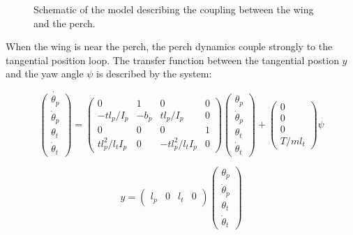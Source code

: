 \documentclass[11pt]{amsart}
\begin{document}
\begin{figure}[h]
  \caption{Schematic of the model describing the coupling between the
    wing and the perch.}
\end{figure}
When the wing is near the perch, the perch dynamics couple strongly to
the tangential position loop.  The transfer function between the
tangential postion $y$ and the yaw angle $\psi$ is described by the
system:

\begin{equation}
\dot{\left(
\begin{array}{c}
\theta_p \\
\dot{\theta}_p \\
\theta_t \\
\dot{\theta}_t
\end{array}
\right)}
=
\left(
\begin{array}{cccc}
0 & 1 & 0 & 0 \\
-t l_p/I_p & -b_p & t l_p/I_p & 0 \\
0 & 0 & 0 & 1 \\
t l_p^2/l_t I_p & 0 & -t l_p^2/l_t I_p & 0
\end{array}
\right)
\left(
\begin{array}{c}
\theta_p \\
\dot{\theta}_p \\
\theta_t \\
\dot{\theta}_t
\end{array}
\right)
+
\left(
\begin{array}{c}
0 \\
0 \\
0 \\
T/m l_t
\end{array}
\right)
\psi
\end{equation}

\begin{equation}
y = \left(
\begin{array}{cccc}
l_p & 0 & l_t & 0
\end{array}
\right)
\left(
\begin{array}{c}
\theta_p \\
\dot{\theta}_p \\
\theta_t \\
\dot{\theta}_t
\end{array}
\right)
\end{equation}
\end{document}

